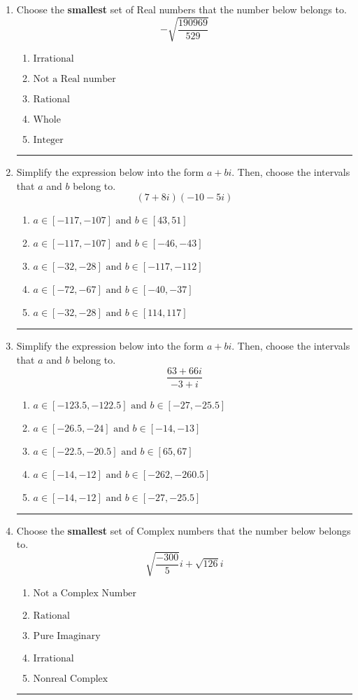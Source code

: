 \documentclass[14pt]{extbook}
\newcommand{\litem}[1]{\item#1\hspace*{-1cm}\rule{\textwidth}{0.4pt}}
\begin{document}
\begin{enumerate}
\litem{
Choose the \textbf{smallest} set of Real numbers that the number below belongs to.\[ -\sqrt{\frac{190969}{529}} \]\begin{enumerate}[label=\Alph*.]
\item \( \text{Irrational} \)
\item \( \text{Not a Real number} \)
\item \( \text{Rational} \)
\item \( \text{Whole} \)
\item \( \text{Integer} \)

\end{enumerate} }
\litem{
Simplify the expression below into the form $a+bi$. Then, choose the intervals that $a$ and $b$ belong to.\[ (7 + 8 i)(-10 - 5 i) \]\begin{enumerate}[label=\Alph*.]
\item \( a \in [-117, -107] \text{ and } b \in [43, 51] \)
\item \( a \in [-117, -107] \text{ and } b \in [-46, -43] \)
\item \( a \in [-32, -28] \text{ and } b \in [-117, -112] \)
\item \( a \in [-72, -67] \text{ and } b \in [-40, -37] \)
\item \( a \in [-32, -28] \text{ and } b \in [114, 117] \)

\end{enumerate} }
\litem{
Simplify the expression below into the form $a+bi$. Then, choose the intervals that $a$ and $b$ belong to.\[ \frac{63 + 66 i}{-3 + i} \]\begin{enumerate}[label=\Alph*.]
\item \( a \in [-123.5, -122.5] \text{ and } b \in [-27, -25.5] \)
\item \( a \in [-26.5, -24] \text{ and } b \in [-14, -13] \)
\item \( a \in [-22.5, -20.5] \text{ and } b \in [65, 67] \)
\item \( a \in [-14, -12] \text{ and } b \in [-262, -260.5] \)
\item \( a \in [-14, -12] \text{ and } b \in [-27, -25.5] \)

\end{enumerate} }
\litem{
Choose the \textbf{smallest} set of Complex numbers that the number below belongs to.\[ \sqrt{\frac{-300}{5}} i+\sqrt{126}i \]\begin{enumerate}[label=\Alph*.]
\item \( \text{Not a Complex Number} \)
\item \( \text{Rational} \)
\item \( \text{Pure Imaginary} \)
\item \( \text{Irrational} \)
\item \( \text{Nonreal Complex} \)


\end{enumerate}}
\end{enumerate}
\end{document}
